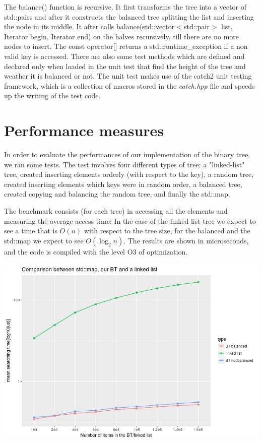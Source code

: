 \documentclass[a4paper,11pt]{article}
\begin{document}
The balance() function is recursive. It first transforms the tree into a vector of std::pairs and after it  constructs the balanced tree splitting the list and inserting the node in its middle. It after calls balance(std::vector$<$std::pair$>$ list, Iterator begin, Iterator end) on the halves recursively, till there are no more nodes to insert.
The const operator[] returns a std::runtime\_exception if a non valid key is accessed.
There are also some test methods which are defined and declared only when loaded in the unit test that find the height of the tree and weather it is balanced or not. 
The unit test makes use of the catch2 unit testing framework, which is a collection of macros stored in the \emph{catch.hpp} file and speeds up the writing of the test code. 

\section*{Performance measures}
In order to evaluate the performances of our implementation of the binary tree, we ran some tests.
The test involves four different types of tree: a "linked-list" tree, created inserting elements orderly (with respect to the key), a random tree, created inserting elements which keys were in random order, a balanced tree, created copying and balancing the random tree, and finally the std::map.

The benchmark consists (for each tree) in accessing all the elements and measuring the average access time:
In the case of the linked-list-tree we expect to see a time that is $O(n)$ with respect to the tree size, for the balanced and the std::map we expect to see $O(\log_2 n)$. 
The results are shown in microseconds, and the code is compiled with the level O3 of optimization.\\

\includegraphics[height=10cm]{./LL_vs_BT.png}\\
\end{document}
